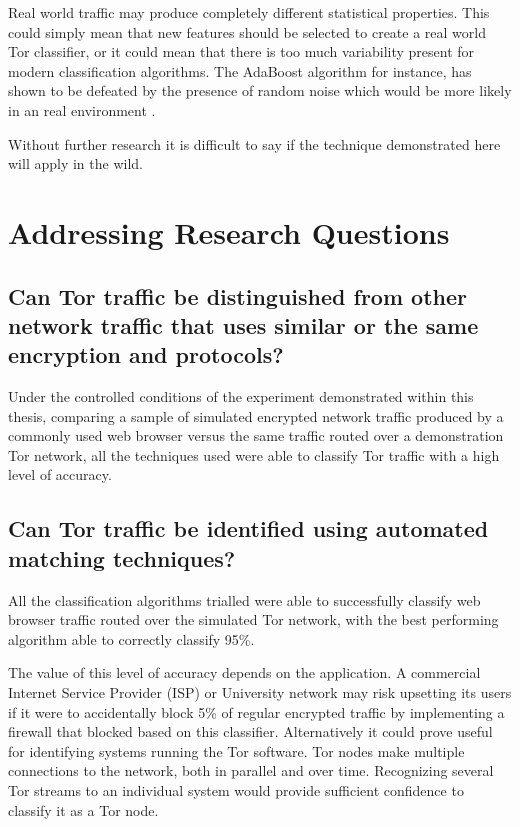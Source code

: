 Real world traffic may produce completely different statistical properties.
This could simply mean that new features should be selected to create a real
world Tor classifier, or it could mean that there is too much variability
present for modern classification algorithms. The AdaBoost algorithm for
instance, has shown to be defeated by the presence of random noise which would
be more likely in an real environment \parencite{Long:2008ha}.

Without further research it is difficult to say if the technique demonstrated
here will apply in the wild.

\section{Addressing Research Questions}

\subsection{Can Tor traffic be distinguished from other network traffic that
uses similar or the same encryption and protocols?}

Under the controlled conditions of the experiment demonstrated within this
thesis, comparing a sample of simulated encrypted network traffic produced
by a commonly used web browser versus the same traffic routed over a
demonstration Tor network, all the techniques used were able to classify
Tor traffic with a high level of accuracy.

\subsection{Can Tor traffic be identified using automated matching techniques?}

All the classification algorithms trialled were able to successfully classify
web browser traffic routed over the simulated Tor network, with the best
performing algorithm able to correctly classify 95\%.

The value of this level of accuracy depends on the application. A
commercial Internet Service Provider (ISP) or University network may risk
upsetting its users if it were to accidentally block 5\% of regular
encrypted traffic by implementing a firewall that blocked based on this
classifier. Alternatively it could prove useful for identifying systems
running the Tor software. Tor nodes make multiple connections to the
network, both in parallel and over time. Recognizing several Tor streams to
an individual system would provide sufficient confidence to classify it as
a Tor node.

